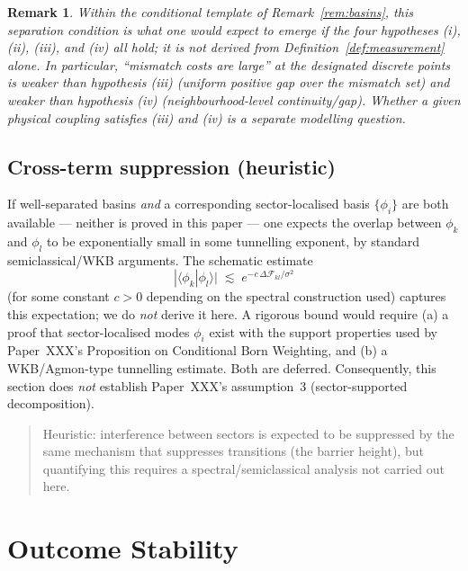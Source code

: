 \documentclass[12pt]{article}
\newtheorem{remark}[theorem]{Remark}
\newcommand{\Fcal}{\mathcal{F}}
\begin{document}
\begin{remark}
Within the conditional template of Remark~\ref{rem:basins}, this separation condition is what one would expect to emerge if the four hypotheses (i), (ii), (iii), and (iv) all hold; it is not derived from Definition~\ref{def:measurement} alone. In particular, ``mismatch costs are large'' at the designated discrete points is weaker than hypothesis (iii) (uniform positive gap over the mismatch set) and weaker than hypothesis (iv) (neighbourhood-level continuity/gap). Whether a given physical coupling satisfies (iii) and (iv) is a separate modelling question.
\end{remark}

\subsection{Cross-term suppression (heuristic)}

If well-separated basins \emph{and} a corresponding sector-localised basis $\{\phi_i\}$ are both available --- neither is proved in this paper --- one expects the overlap between $\phi_k$ and $\phi_l$ to be exponentially small in some tunnelling exponent, by standard semiclassical/WKB arguments. The schematic estimate
\begin{equation}\label{eq:overlap}
    |\langle \phi_k | \phi_l \rangle| \;\lesssim\; e^{-c\,\Delta\Fcal_{kl}/\sigma^2}
\end{equation}
(for some constant $c > 0$ depending on the spectral construction used) captures this expectation; we do \emph{not} derive it here. A rigorous bound would require (a) a proof that sector-localised modes $\phi_i$ exist with the support properties used by Paper~XXX's Proposition on Conditional Born Weighting, and (b) a WKB/Agmon-type tunnelling estimate. Both are deferred. Consequently, this section does \emph{not} establish Paper~XXX's assumption~3 (sector-supported decomposition).

\begin{quote}
Heuristic: interference between sectors is expected to be suppressed by the same mechanism that suppresses transitions (the barrier height), but quantifying this requires a spectral/semiclassical analysis not carried out here.
\end{quote}

\section{Outcome Stability}\label{sec:stability}
\end{document}
